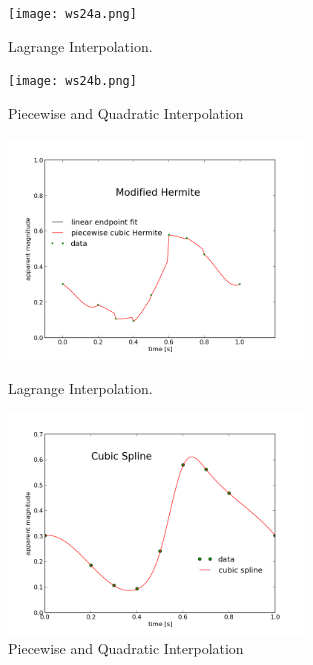 \documentclass[11pt,letterpaper]{article}
\begin{document}
\begin{figure}[bth]
\centering
\texttt{[image: ws24a.png]}
\caption{Lagrange Interpolation.}
\label{fig:2}
\texttt{[image: ws24b.png]}
\caption{Piecewise and Quadratic Interpolation}
\label{fig:2}
\end{figure}

\begin{figure}[bth]
\centering
\includegraphics[width=0.7\textwidth]{ws25a.png}
\caption{Lagrange Interpolation.}
\label{fig:3}
\includegraphics[width=0.7\textwidth]{ws25b.png}
\caption{Piecewise and Quadratic Interpolation}
\label{fig:3}
\end{figure}
\end{document}
